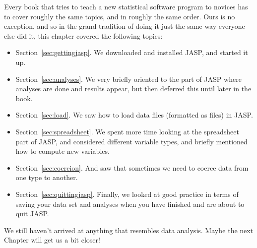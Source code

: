Every book that tries to teach a new statistical software program to novices has to cover roughly the same topics, and in roughly the same order. Ours is no exception, and so in the grand tradition of doing it just the same way everyone else did it, this chapter covered the following topics:

\begin{itemize}
\item Section~\ref{sec:gettingjasp}. We downloaded and installed JASP, and started it up.
\item Section~\ref{sec:analyses}. We very briefly oriented to the part of JASP where analyses are done and results appear, but then deferred this until later in the book.
\item Section~\ref{sec:load}. We saw how to load data files (formatted as  files) in JASP.
\item Section~\ref{sec:spreadsheet}. We spent more time looking at the spreadsheet part of JASP, and considered different variable types, and briefly mentioned how to compute new variables.
\item Section~\ref{sec:coercion}. And saw that sometimes we need to coerce data from one type to another.
\item Section~\ref{sec:quittingjasp}. Finally, we looked at good practice in terms of saving your data set and analyses when you have finished and are about to quit JASP.
\end{itemize}

\noindent
We still haven't arrived at anything that resembles data analysis. Maybe the next Chapter will get us a bit closer!



